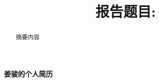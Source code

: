 \documentclass{article}      %
\begin{document}

\title{报告题目:~}

\author{
\small
\small
}
\date{}					%
\maketitle
\thispagestyle{fancy}   %

\begin{abstract}
摘要内容
\end{abstract}



\textbf{姜骏的个人简历}
\end{document}
